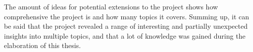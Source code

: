 The amount of ideas for potential extensions to the project shows how comprehensive the project is and how many topics it covers.
Summing up, it can be said that the project revealed a range of interesting and partially unexpected insights into multiple topics, and that a lot of knowledge was gained during the elaboration of this thesis.

%




%
%
%
